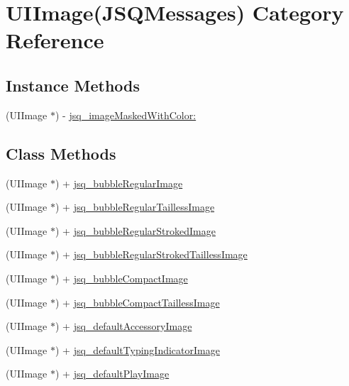 \hypertarget{category_u_i_image_07_j_s_q_messages_08}{}\section{U\+I\+Image(J\+S\+Q\+Messages) Category Reference}
\label{category_u_i_image_07_j_s_q_messages_08}
\subsection*{Instance Methods}
\begin{DoxyCompactItemize}
\item 
(U\+I\+Image $\ast$) -\/ \hyperlink{category_u_i_image_07_j_s_q_messages_08_a587504cbd14d71ea35e476fea0db009d}{jsq\+\_\+image\+Masked\+With\+Color\+:}
\end{DoxyCompactItemize}
\subsection*{Class Methods}
\begin{DoxyCompactItemize}
\item 
(U\+I\+Image $\ast$) + \hyperlink{category_u_i_image_07_j_s_q_messages_08_ab12366155d2a4254b96a6ad76d063f23}{jsq\+\_\+bubble\+Regular\+Image}
\item 
(U\+I\+Image $\ast$) + \hyperlink{category_u_i_image_07_j_s_q_messages_08_aa62019606a2bad47127aa72292bae3b5}{jsq\+\_\+bubble\+Regular\+Tailless\+Image}
\item 
(U\+I\+Image $\ast$) + \hyperlink{category_u_i_image_07_j_s_q_messages_08_a20cc4f04d78924d21f84ae2e5e04b983}{jsq\+\_\+bubble\+Regular\+Stroked\+Image}
\item 
(U\+I\+Image $\ast$) + \hyperlink{category_u_i_image_07_j_s_q_messages_08_af1e1c57800509f3a4e6613b849a6168b}{jsq\+\_\+bubble\+Regular\+Stroked\+Tailless\+Image}
\item 
(U\+I\+Image $\ast$) + \hyperlink{category_u_i_image_07_j_s_q_messages_08_a4bf0675739f69f8bbfdfebf7a80eb166}{jsq\+\_\+bubble\+Compact\+Image}
\item 
(U\+I\+Image $\ast$) + \hyperlink{category_u_i_image_07_j_s_q_messages_08_aa33f7ca094f013e96043336a5e6bdea1}{jsq\+\_\+bubble\+Compact\+Tailless\+Image}
\item 
(U\+I\+Image $\ast$) + \hyperlink{category_u_i_image_07_j_s_q_messages_08_ad7111687712b4c9e0ab26b9b43d4fa43}{jsq\+\_\+default\+Accessory\+Image}
\item 
(U\+I\+Image $\ast$) + \hyperlink{category_u_i_image_07_j_s_q_messages_08_a0a0a5e813388dec83b493a3ce81d0bdb}{jsq\+\_\+default\+Typing\+Indicator\+Image}
\item 
(U\+I\+Image $\ast$) + \hyperlink{category_u_i_image_07_j_s_q_messages_08_a08086b3da39e30d0f6e8369e8d0d1997}{jsq\+\_\+default\+Play\+Image}
\end{DoxyCompactItemize}


